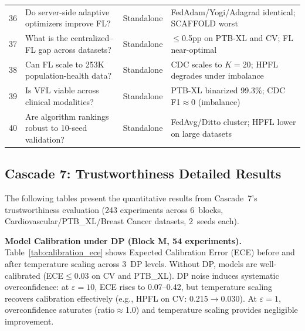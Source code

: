 \documentclass[conference]{IEEEtran}
\begin{document}
\begin{table}[htbp]
{\begin{tabular}{clll}
\midrule
36 & Do server-side adaptive optimizers improve FL? & Standalone & FedAdam/Yogi/Adagrad identical; SCAFFOLD worst \\
37 & What is the centralized--FL gap across datasets? & Standalone & $\leq$0.5pp on PTB-XL and CV; FL near-optimal \\
38 & Can FL scale to 253K population-health data? & Standalone & CDC scales to $K{=}20$; HPFL degrades under imbalance \\
39 & Is VFL viable across clinical modalities? & Standalone & PTB-XL binarized 99.3\%; CDC F1$\approx$0 (imbalance) \\
40 & Are algorithm rankings robust to 10-seed validation? & Standalone & FedAvg/Ditto cluster; HPFL lower on large datasets \\
\bottomrule
\end{tabular}%
}
\end{table}

\subsection{Cascade 7: Trustworthiness Detailed Results}

The following tables present the quantitative results from Cascade~7's trustworthiness evaluation (243 experiments across 6~blocks, Cardiovascular/PTB\_XL/Breast Cancer datasets, 2~seeds each).

\smallskip\noindent\textbf{Model Calibration under DP (Block M, 54 experiments).}
Table~\ref{tab:calibration_ece} shows Expected Calibration Error (ECE) before and after temperature scaling across 3~DP levels. Without DP, models are well-calibrated (ECE$\leq$0.03 on CV and PTB\_XL). DP noise induces systematic overconfidence: at $\varepsilon{=}10$, ECE rises to 0.07--0.42, but temperature scaling recovers calibration effectively (e.g., HPFL on CV: 0.215$\to$0.030). At $\varepsilon{=}1$, overconfidence saturates (ratio$\approx$1.0) and temperature scaling provides negligible improvement.
\end{document}
